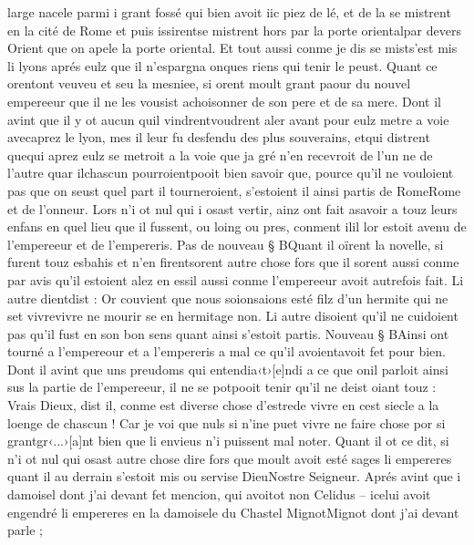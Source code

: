 \documentclass{article}
\begin{document}
\begin{pages}
   large nacele parmi i 
   grant fossé qui bien avoit iic piez de lé, 
   et de la se mistrent en la cité de Rome et puis 
   issirentse mistrent hors par la porte 
   orientalpar devers Orient que on apele la porte oriental. 
   Et tout aussi conme je dis se mists’est mis 
   li lyons aprés eulz que il n’espargna onques riens qui tenir le peust. \pend
\pstart Quant ce orentont 
   veuveu et seu la mesniee, si orent moult grant paour du
   nouvel empereeur que il ne les vousist achoisonner de
   son pere et de sa mere. 
   Dont il avint que il y ot aucun quil vindrentvoudrent aler 
   avant pour eulz metre a voie 
   avecaprez 
   le lyon, mes il leur fu desfendu des plus souverains, 
   etqui distrent 
   quequi aprez eulz se metroit a la voie que ja gré n'en recevroit de l'un ne de 
      l'autre quar ilchascun 
         pourroientpooit bien savoir que, pource qu’il ne vouloient pas que on seust
         quel part il tourneroient, s’estoient il ainsi partis de 
         RomeRome et de l'onneur.
   Lors n’i ot nul qui i osast vertir, ainz ont fait asavoir a touz leurs enfans en quel lieu que il fussent, ou loing ou pres, 
   conment ilil lor estoit avenu de 
   l’empereeur et de l’empereris. \pend
\pstart Pas de nouveau § BQuant il oïrent la novelle, si furent touz esbahis et 
   n’en firentsorent autre chose fors que il sorent aussi conme par avis 
   qu’il estoient alez en essil aussi conme l’empereeur avoit autrefois fait. 
   Li autre dientdist :
   Or couvient que nous soionsaions esté 
      filz d’un hermite qui ne set vivrevivre ne mourir se en hermitage non.
   Li autre disoient qu’il ne cuidoient pas qu’il fust en son bon sens quant ainsi s’estoit partis.
   Nouveau § BAinsi ont tourné a l’empereour 
   et a l’empereris a mal ce qu’il 
   avoientavoit fet pour bien. Dont il avint que uns preudoms qui 
   entendia‹t›[e]ndi a 
   ce que onil parloit ainsi sus la partie de 
   l’empereeur, il ne se 
   potpooit tenir qu’il ne deist oiant touz :
   Vrais Dieux, dist il, conme est diverse chose 
      d’estrede vivre en cest siecle a la loenge de chascun !
      Car je voi que nuls si n’ine puet vivre ne faire chose por si 
      grantgr‹...›[a]nt bien que li envieus n’i puissent mal noter.
   Quant il ot ce dit, si n’i ot nul qui osast autre chose dire fors que moult avoit esté sages
      li empereres quant il au derrain s’estoit mis ou servise 
      DieuNostre Seigneur.
   Aprés avint que i damoisel dont j’ai devant fet mencion, 
   qui avoitot non 
   Celidus – icelui avoit engendré li empereres en 
               la damoisele du Chastel 
                  MignotMignot dont j'ai devant parle ; 

\end{pages}
\end{document}
